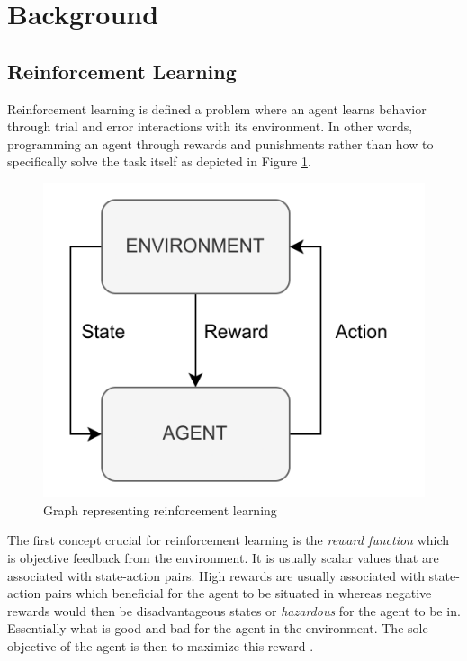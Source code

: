 \section{Background}

\subsection{Reinforcement Learning}

Reinforcement learning is defined a problem where an agent learns behavior through trial and error interactions with its environment. In other words, programming an agent through rewards and punishments rather than how to specifically solve the task itself \cite{kaelbling1996reinforcement} as depicted in Figure \ref{figRL}.
\begin{figure}[H]
    \centering
    \includegraphics [scale = 0.2]{Images/RL_graph.png}
    \caption{Graph representing reinforcement learning}
    \label{figRL}
\end{figure}
The first concept crucial for reinforcement learning is the \textit{reward function} which is objective feedback from the environment. It is usually scalar values that are associated with state-action pairs. High rewards are usually associated with state-action pairs which beneficial for the agent to be situated in whereas negative rewards would then be disadvantageous states or \textit{hazardous} for the agent to be in. Essentially what is good and bad for the agent in the environment. The sole objective of the agent is then to maximize this reward \cite{sutton1999reinforcement}.

